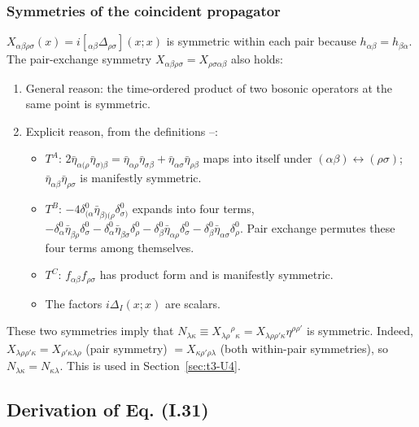 \subsubsection{Symmetries of the coincident propagator \texorpdfstring{\tD}{}}\label{sec:t3-sym}
\(X_{\alpha\beta\rho\sigma}(x)=i[{}_{\alpha\beta}\Delta_{\rho\sigma}](x;x)\) is symmetric within
each pair because \(h_{\alpha\beta}=h_{\beta\alpha}\). The pair-exchange symmetry
\(X_{\alpha\beta\rho\sigma}=X_{\rho\sigma\alpha\beta}\) also holds:
\begin{enumerate}
\item General reason: the time-ordered product of two bosonic operators at the same point
is symmetric.
\item Explicit reason, from the definitions --:
\begin{itemize}
\item \(T^A\): \(2\bar\eta_{\alpha(\rho}\bar\eta_{\sigma)\beta}=\bar\eta_{\alpha\rho}\bar\eta_{\sigma\beta}+\bar\eta_{\alpha\sigma}\bar\eta_{\rho\beta}\)
maps into itself under \((\alpha\beta)\leftrightarrow(\rho\sigma)\); \(\bar\eta_{\alpha\beta}\bar\eta_{\rho\sigma}\)
is manifestly symmetric.
\item \(T^B\): \(-4\delta^0_{(\alpha}\bar\eta_{\beta)(\rho}\delta^0_{\sigma)}\) expands into four
terms, \(-\delta^0_\alpha\bar\eta_{\beta\rho}\delta^0_\sigma-\delta^0_\alpha\bar\eta_{\beta\sigma}\delta^0_\rho
-\delta^0_\beta\bar\eta_{\alpha\rho}\delta^0_\sigma-\delta^0_\beta\bar\eta_{\alpha\sigma}\delta^0_\rho\).
Pair exchange permutes these four terms among themselves.
\item \(T^C\): \(f_{\alpha\beta}f_{\rho\sigma}\) has product form and is manifestly symmetric.
\item The factors \(i\Delta_I(x;x)\) are scalars.
\end{itemize}
\end{enumerate}
These two symmetries imply that
\(N_{\lambda\kappa}\equiv X_{\lambda\rho}{}^{\rho}{}_{\kappa}=X_{\lambda\rho\rho'\kappa}\eta^{\rho\rho'}\)
is symmetric. Indeed, \(X_{\lambda\rho\rho'\kappa}=X_{\rho'\kappa\lambda\rho}\) (pair symmetry)
\(=X_{\kappa\rho'\rho\lambda}\) (both within-pair symmetries), so \(N_{\lambda\kappa}=N_{\kappa\lambda}\).
This is used in Section~\ref{sec:t3-U4}.

\subsection{Derivation of Eq. (I.31)}

